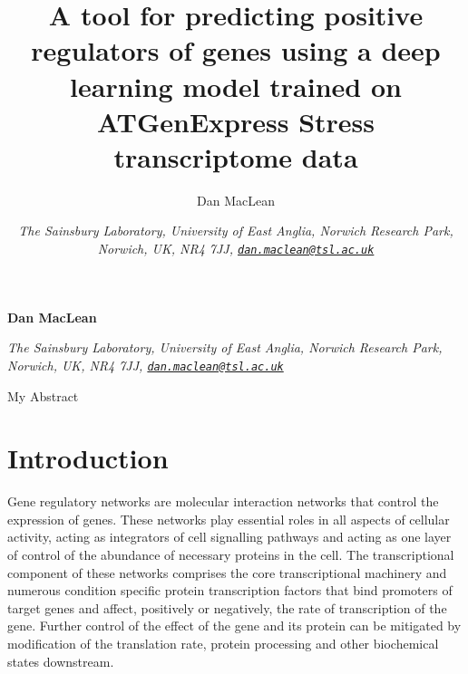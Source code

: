 \documentclass[12pt,a4paper,]{article}
\title{A tool for predicting positive regulators of genes using a deep learning model trained on ATGenExpress Stress transcriptome data  }
\author{\Large Dan MacLean\vspace{0.05in} \newline\normalsize\emph{}   \and \Large \vspace{0.05in} \newline\normalsize\emph{The Sainsbury Laboratory, University of East Anglia, Norwich Research Park, Norwich, UK, NR4 7JJ, \href{mailto:dan.maclean@tsl.ac.uk}{\nolinkurl{dan.maclean@tsl.ac.uk}}}  }
\date{}
\newcommand*{\authorfont}{\fontfamily{phv}\selectfont}
\renewenvironment{abstract}
 {{%
    \setlength{\leftmargin}{0mm}
    \setlength{\rightmargin}{\leftmargin}%
  }%
  \relax}
 {\endlist}
\begin{document}
	
%

{%
\setlength{\parindent}{0pt}
\thispagestyle{plain}
{\fontsize{18}{20}\selectfont\raggedright 
\maketitle  %

}

{
   \vskip 13.5pt\relax \normalsize\fontsize{11}{12} 
\textbf{\authorfont Dan MacLean} \hskip 15pt \emph{\small }   \par \textbf{\authorfont } \hskip 15pt \emph{\small The Sainsbury Laboratory, University of East Anglia, Norwich Research Park, Norwich, UK, NR4 7JJ, \href{mailto:dan.maclean@tsl.ac.uk}{\nolinkurl{dan.maclean@tsl.ac.uk}}}   

}

}








\begin{abstract}

    \hbox{\vrule height .2pt width 39.14pc}

    \vskip 8.5pt %

\noindent My Abstract


    \hbox{\vrule height .2pt width 39.14pc}


\end{abstract}


\vskip 6.5pt


\noindent  \hypertarget{introduction}{%
\section{Introduction}\label{introduction}}

Gene regulatory networks are molecular interaction networks that control the expression of genes. These networks play essential roles in all aspects of cellular activity, acting as integrators of cell signalling pathways and acting as one layer of control of the abundance of necessary proteins in the cell. The transcriptional component of these networks comprises the core transcriptional machinery and numerous condition specific protein transcription factors that bind promoters of target genes and affect, positively or negatively, the rate of transcription of the gene. Further control of the effect of the gene and its protein can be mitigated by modification of the translation rate, protein processing and other biochemical states downstream.
\end{document}
